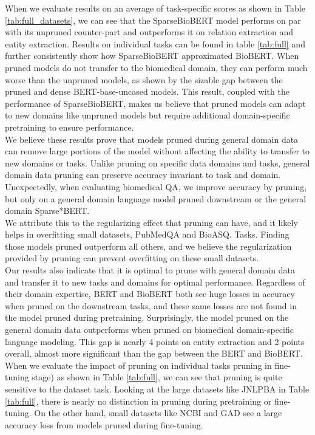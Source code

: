 \documentclass[10pt]{article}
\begin{document}
When we evaluate results on an average of task-specific scores as shown in Table \ref{tab:full_datasets}, we can see that the SparseBioBERT model performs on par with its unpruned counter-part and outperforms it on relation extraction and entity extraction. Results on individual tasks can be found in table \ref{tab:full} and further consistently show how SparseBioBERT approximated BioBERT. When pruned models do not transfer to the biomedical domain, they can perform much worse than the unpruned models, as shown by the sizable gap between the pruned and dense BERT-base-uncased models. This result, coupled with the performance of SparseBioBERT, makes us believe that pruned models can adapt to new domains like unpruned models but require additional domain-specific pretraining to ensure performance. \\
We believe these results prove that models pruned during general domain data can remove large portions of the model without affecting the ability to transfer to new domains or tasks. Unlike pruning on specific data domains and tasks, general domain data pruning can preserve accuracy invariant to task and domain. \\
Unexpectedly, when evaluating biomedical QA, we improve accuracy by pruning, but only on a general domain language model pruned downstream or the general domain Sparse*BERT. \\ We attribute this to the regularizing effect that pruning can have, and it likely helps in overfitting small datasets, PubMedQA and BioASQ. Tasks. Finding those models pruned outperform all others, and we believe the regularization provided by pruning can prevent overfitting on these small datasets.  \\
Our results also indicate that it is optimal to prune with general domain data and transfer it to new tasks and domains for optimal performance. Regardless of their domain expertise, BERT and BioBERT both see huge losses in accuracy when pruned on the downstream tasks, and these same losses are not found in the model pruned during pretraining. Surprisingly, the model pruned on the general domain data outperforms when pruned on biomedical domain-specific language modeling. This gap is nearly 4 points on entity extraction and 2 points overall, almost more significant than the gap between the BERT and BioBERT. \\
When we evaluate the impact of pruning on individual tasks pruning in fine-tuning stage) as shown in Table \ref{tab:full}, we can see that pruning is quite sensitive to the dataset task. Looking at the large datasets like JNLPBA in Table \ref{tab:full}, there is nearly no distinction in pruning during pretraining or fine-tuning. On the other hand, small datasets like NCBI and GAD see a large accuracy loss from models pruned during fine-tuning.  \\
\end{document}
